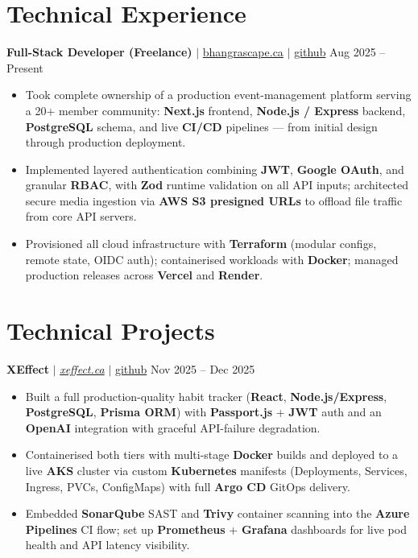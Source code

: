 \documentclass[11pt,a4paper]{article}
\begin{document}
\section{Technical Experience}

\textbf{Full-Stack Developer (Freelance)} $|$ \href{https://bhangrascape.ca}{bhangrascape.ca} $|$ \href{https://github.com/bhat0155/bhangraescape}{\small github} \hfill Aug 2025 -- Present
\begin{itemize}
    \item Took complete ownership of a production event-management platform serving a 20+ member community: \textbf{Next.js} frontend, \textbf{Node.js / Express} backend, \textbf{PostgreSQL} schema, and live \textbf{CI/CD} pipelines — from initial design through production deployment.
    \item Implemented layered authentication combining \textbf{JWT}, \textbf{Google OAuth}, and granular \textbf{RBAC}, with \textbf{Zod} runtime validation on all API inputs; architected secure media ingestion via \textbf{AWS S3 presigned URLs} to offload file traffic from core API servers.
    \item Provisioned all cloud infrastructure with \textbf{Terraform} (modular configs, remote state, OIDC auth); containerised workloads with \textbf{Docker}; managed production releases across \textbf{Vercel} and \textbf{Render}.
\end{itemize}

\section{Technical Projects}

\textbf{XEffect} $|$ \href{https://www.xeffect.ca/app}{\emph{xeffect.ca}} $|$ \href{https://github.com/bhat0155/xeffect}{\small github} \hfill Nov 2025 -- Dec 2025
\begin{itemize}
    \item Built a full production-quality habit tracker (\textbf{React}, \textbf{Node.js/Express}, \textbf{PostgreSQL}, \textbf{Prisma ORM}) with \textbf{Passport.js} + \textbf{JWT} auth and an \textbf{OpenAI} integration with graceful API-failure degradation.
    \item Containerised both tiers with multi-stage \textbf{Docker} builds and deployed to a live \textbf{AKS} cluster via custom \textbf{Kubernetes} manifests (Deployments, Services, Ingress, PVCs, ConfigMaps) with full \textbf{Argo CD} GitOps delivery.
    \item Embedded \textbf{SonarQube} SAST and \textbf{Trivy} container scanning into the \textbf{Azure Pipelines} CI flow; set up \textbf{Prometheus} + \textbf{Grafana} dashboards for live pod health and API latency visibility.
\end{itemize}
\end{document}
